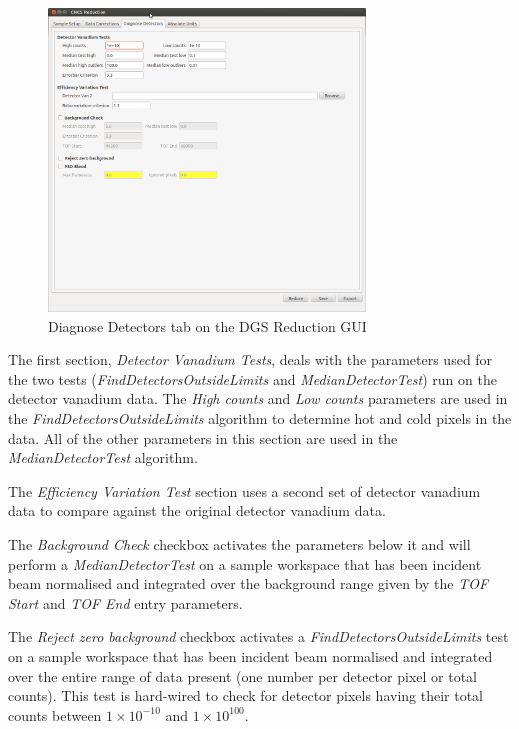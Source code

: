 \begin{figure}[ht]
\centerline{\includegraphics[width=0.75\textwidth]{figures/DiagnoseDetectors.png}}
\caption{Diagnose Detectors tab on the DGS Reduction GUI}
\label{fig:DiagDet}
\end{figure}

The first section, \textit{Detector Vanadium Tests}, deals with the parameters used for the two tests (\textit{FindDetectorsOutsideLimits} and \textit{MedianDetectorTest}) run on the detector vanadium data. The \textit{High counts} and \textit{Low counts} parameters are used in the \textit{FindDetectorsOutsideLimits} algorithm to determine hot and cold pixels in the data. All of the other parameters in this section are used in the \textit{MedianDetectorTest} algorithm. 

The \textit{Efficiency Variation Test} section uses a second set of detector vanadium data to compare against the original detector vanadium data. 

The \textit{Background Check} checkbox activates the parameters below it and will perform a \textit{MedianDetectorTest} on a sample workspace that has been incident beam normalised and integrated over the background range given by the \textit{TOF Start} and \textit{TOF End} entry parameters.

The \textit{Reject zero background} checkbox activates a \textit{FindDetectorsOutsideLimits} test on a sample workspace that has been incident beam normalised and integrated over the entire range of data present (one number per detector pixel or total counts). This test is hard-wired to check for detector pixels having their total counts between $1\times10^{-10}$ and $1\times10^{100}$. 

